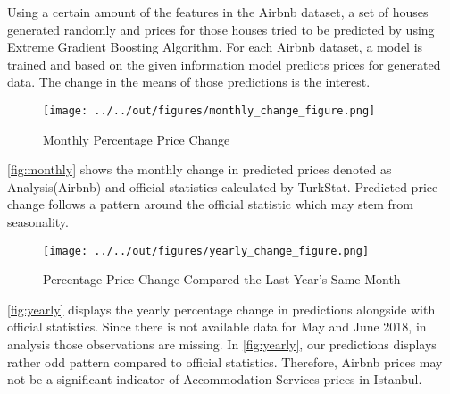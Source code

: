 \documentclass[11pt, a4paper, leqno]{article}
\begin{document}
Using a certain amount of the features in the Airbnb dataset,
a set of houses generated randomly and prices for those houses
tried to be predicted by using Extreme Gradient Boosting Algorithm.
For each Airbnb dataset, a model is trained and based on the given
information model predicts prices for generated data.
The change in the means of those predictions is the interest.

\begin{figure}[H]
    \texttt{[image: ../../out/figures/monthly\_change\_figure.png]}
    \caption{Monthly Percentage Price Change}
    \label{fig:monthly}
\end{figure}
\autoref{fig:monthly} shows the monthly change in predicted prices
denoted as Analysis(Airbnb) and
official statistics calculated by TurkStat.
Predicted price change follows a pattern around the official statistic
which may stem from seasonality.

\begin{figure}[H]
    \texttt{[image: ../../out/figures/yearly\_change\_figure.png]}
    \caption{Percentage Price Change Compared the Last Year's Same Month}
    \label{fig:yearly}
\end{figure}


\autoref{fig:yearly} displays the yearly percentage change in predictions
alongside with official statistics.
Since there is not available data for May and June 2018,
in analysis those observations are missing.
In \autoref{fig:yearly}, our predictions displays
rather odd pattern compared to official statistics.
Therefore, Airbnb prices may not be a significant indicator
of Accommodation Services prices in Istanbul.






\end{document}
